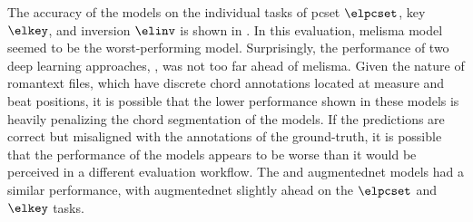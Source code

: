 

The accuracy of the models on the individual tasks of
\gls{pcset} $\elpcset$, key $\elkey$, and inversion $\elinv$
is shown in . In this evaluation,
\gls{melisma} model seemed to be the worst-performing model.
Surprisingly, the performance of two deep learning
approaches, \textcite{mcleod2021modular,chen2021attend}, was
not too far ahead of \gls{melisma}. Given the nature of
\gls{romantext} files, which have discrete chord annotations
located at measure and beat positions, it is possible that
the lower performance shown in these models is heavily
penalizing the chord segmentation of the models. If the
predictions are correct but misaligned with the annotations
of the ground-truth, it is possible that the performance of
the models appears to be worse than it would be perceived in
a different evaluation workflow. The
\textcite{micchi2021deep} and \gls{augmentednet} models had
a similar performance, with \gls{augmentednet} slightly
ahead on the $\elpcset$ and $\elkey$ tasks.

